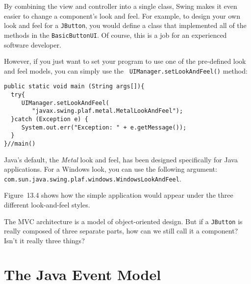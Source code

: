 By combining the view and controller into a single class, Swing makes
it even easier to change a component's look and feel.  For example, to
design your own look and feel for a {\tt JButton}, you would define a
class that implemented all of the methods in the
{\tt BasicButtonUI}. Of course, this is a job for an experienced software
developer.

However, if you just want to set your program to use one of the
pre-defined look and feel models, you can simply use the {\tt
UIManager.set\-LookAndFeel()} method:

\begin{jjjlisting}
\begin{lstlisting}
public static void main (String args[]){
  try{
     UIManager.setLookAndFeel(
        "javax.swing.plaf.metal.MetalLookAndFeel");
  }catch (Exception e) {
     System.out.err("Exception: " + e.getMessage());
  }
}//main()
\end{lstlisting}
\end{jjjlisting}

Java's default, the {\it Metal} look and feel, has been designed
specifically for Java applications.  For a Windows look, you can use
the following argument:
\verb|com.sun.java.swing.plaf.windows.WindowsLookAndFeel|.\break

\noindent Figure~13.4
shows how the simple application would appear under the
three different look-and-feel styles.



\begin{SSTUDY}

\item  The MVC architecture is a model of object-oriented design.  But if a
{\tt JButton} is really composed of three separate parts, how can we
still call it a component? Isn't it really three things?

\end{SSTUDY}

\section{The Java Event Model}

